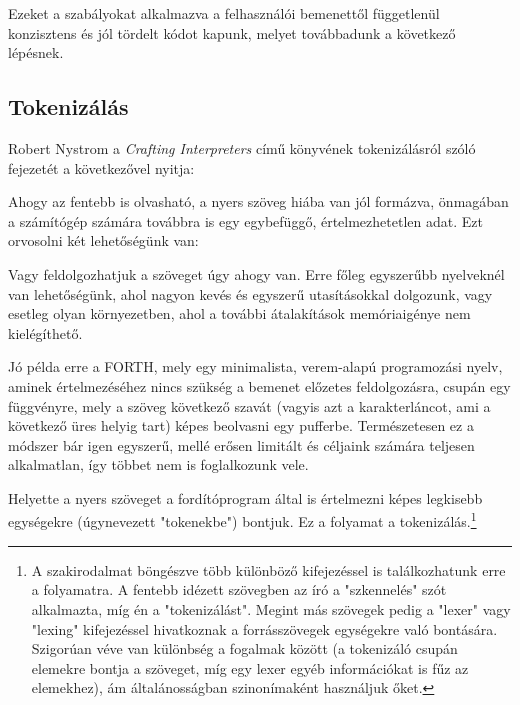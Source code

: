 Ezeket a szabályokat alkalmazva a felhasználói bemenettől függetlenül konzisztens és jól tördelt kódot kapunk, melyet továbbadunk a következő lépésnek.

\subsection{Tokenizálás}
\label{sec:tokenizer_tech}

Robert Nystrom a \textit{Crafting Interpreters}\cite{crafting} című könyvének tokenizálásról szóló fejezetét a következővel nyitja:


Ahogy az fentebb is olvasható, a nyers szöveg hiába van jól formázva, önmagában a számítógép számára továbbra is egy egybefüggő, értelmezhetetlen adat. Ezt orvosolni két lehetőségünk van:

Vagy feldolgozhatjuk a szöveget úgy ahogy van. Erre főleg egyszerűbb nyelveknél van lehetőségünk, ahol nagyon kevés és egyszerű utasításokkal dolgozunk, vagy esetleg olyan környezetben, ahol a további átalakítások memóriaigénye nem kielégíthető.

Jó példa erre a FORTH, mely egy minimalista, verem-alapú programozási nyelv, aminek értelmezéséhez nincs szükség a bemenet előzetes feldolgozásra, csupán egy függvényre, mely a szöveg következő szavát (vagyis azt a karakterláncot, ami a következő üres helyig tart) képes beolvasni egy pufferbe. Természetesen ez a módszer bár igen egyszerű, mellé erősen limitált és céljaink számára teljesen alkalmatlan, így többet nem is foglalkozunk vele.

Helyette a nyers szöveget a fordítóprogram által is értelmezni képes legkisebb egységekre (úgynevezett "tokenekbe") bontjuk. Ez a folyamat a tokenizálás.\footnote{A szakirodalmat böngészve több különböző kifejezéssel is találkozhatunk erre a folyamatra. A fentebb idézett szövegben az író a "szkennelés" szót alkalmazta, míg én a "tokenizálást". Megint más szövegek pedig a "lexer" vagy "lexing" kifejezéssel hivatkoznak a forrásszövegek egységekre való bontására. Szigorúan véve van különbség a fogalmak között (a tokenizáló csupán elemekre bontja a szöveget, míg egy lexer egyéb információkat is fűz az elemekhez), ám általánosságban szinonímaként használjuk őket.}

